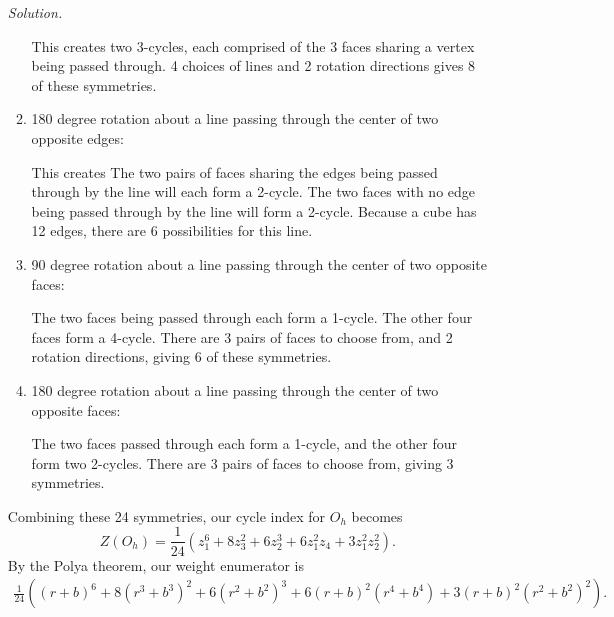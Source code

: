 \documentclass[11pt,letterpaper]{article}
\newenvironment{solution}{\color{black}\textit{Solution.}}{\color{gray}}
\begin{document}
\begin{enumerate}
\begin{solution}
\begin{enumerate}
            This creates two 3-cycles, each comprised of the 3 faces sharing a vertex being passed through. 4 choices of lines and 2 rotation directions gives 8 of these symmetries.
            \item 180 degree rotation about a line passing through the center of two opposite edges:
            
            This creates The two pairs of faces sharing the edges being passed through by the line will each form a 2-cycle. The two faces with no edge being passed through by the line will form a 2-cycle. Because a cube has 12 edges, there are 6 possibilities for this line.
            \item 90 degree rotation about a line passing through the center of two opposite faces:
            
            The two faces being passed through each form a 1-cycle. The other four faces form a 4-cycle. There are 3 pairs of faces to choose from, and 2 rotation directions, giving 6 of these symmetries.
            \item 180 degree rotation about a line passing through the center of two opposite faces: 
            
            The two faces passed through each form a 1-cycle, and the other four form two 2-cycles. There are 3 pairs of faces to choose from, giving 3 symmetries.
        \end{enumerate}

    Combining these 24 symmetries, our cycle index for $O_h$ becomes
    \[
        {\displaystyle Z(O_h)={\frac {1}{24}}\left(z_{1}^{6}+8z_{3}^{2}+6z_{2}^{3}+6z_{1}^{2}z_{4}+3z_{1}^{2}z_{2}^{2}\right).}
    \]
    By the Polya theorem, our weight enumerator is
\begin{align*}
    {{\frac {1}{24}}\left((r+b)^{6}+8(r^3+b^3)^{2}+6(r^2+b^2)^{3}+6(r+b)^{2}(r^4+b^4)+3(r+b)^{2}(r^2+b^2)^{2}\right).}
\end{align*}
    \end{solution}
\end{enumerate}
\end{document}
